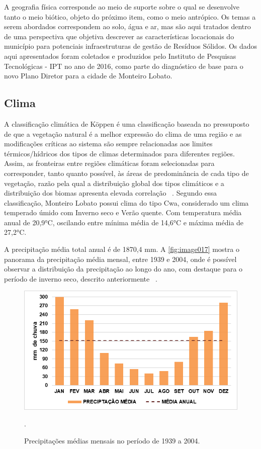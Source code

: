 A geografia física corresponde ao meio de suporte sobre o qual se desenvolve tanto o meio biótico, objeto do próximo item, como o meio antrópico. Os temas a serem abordados correspondem ao solo, água e ar, mas são aqui tratados dentro de uma perspectiva que objetiva descrever as características locacionais do município para potenciais infraestruturas de gestão de Resíduos Sólidos. Os dados aqui apresentados foram coletados e produzidos pelo Instituto de Pesquisas Tecnológicas - IPT no ano de 2016, como parte do diagnóstico de base para o novo Plano Diretor para a cidade de Monteiro Lobato.

\subsection{Clima}

A classificação climática de Köppen é uma classificação baseada no pressuposto de que a vegetação natural é a melhor expressão do clima de uma região e as modificações críticas ao sistema são sempre relacionadas aos limites térmicos/hídricos dos tipos de climas determinados para diferentes regiões. Assim, as fronteiras entre regiões climáticas foram selecionadas para corresponder, tanto quanto possível, às áreas de predominância de cada tipo de vegetação, razão pela qual a distribuição global dos tipos climáticos e a distribuição dos biomas apresenta elevada correlação ~\cite{Rolim2007}. Segundo essa classificação, Monteiro Lobato possui clima do tipo Cwa, considerado um clima temperado úmido com Inverno seco e Verão quente. Com temperatura média anual de 20,9°C, oscilando entre mínima média de 14,6°C e máxima média de 27,2°C.

A precipitação média total anual é de 1870,4 mm. A \autoref{fig:image017} mostra o panorama da precipitação média mensal, entre 1939 e 2004, onde é possível observar a distribuição da precipitação ao longo do ano, com destaque para o período de inverno seco, descrito anteriormente ~\cite{MonteiroLobato2014}.
\clearpage
 \begin{figure}[h!]
	\centering
	\includegraphics[width=1\linewidth]{produtos/proddois/image017}
	\caption{Precipitações médias mensais no período de 1939 a 2004.}
	.
	\label{fig:image017}
\end{figure}



